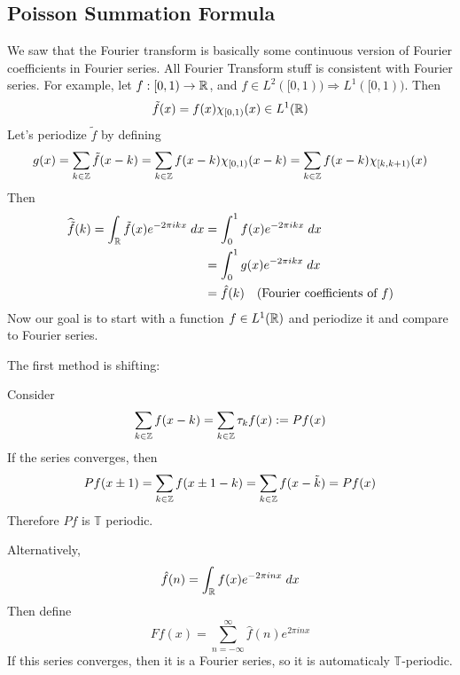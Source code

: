 \subsection{Poisson Summation Formula}
We saw that the Fourier transform is basically some continuous version of Fourier coefficients in
Fourier series. 
All Fourier Transform stuff is consistent with Fourier series. For example, let $f : [0, 1) \to \mathbb{R}$,
and $f \in L^2([0, 1)) \Rightarrow L^1([0, 1))$. Then
\[
    \tilde{f}(x) = f(x) \chi_{[0, 1)}(x) \in L^1(\mathbb{R})
\] 
Let's periodize $\tilde{f}$ by defining 
\[
    g(x) = \sum_{k \in \mathbb{Z}} \tilde{f}(x - k) = \sum_{k \in \mathbb{Z}} f(x-k) \chi_{[0, 1)}(x-k) = \sum_{k \in \mathbb{Z}} f(x-k) \chi_{[k, k+1)}(x)
\]  
Then
\begin{align*}
    \widehat{\tilde{f}}(k) = \int_{\mathbb{R}} \tilde{f}(x) e^{-2 \pi i k x} \; dx &= \int_0^1 f(x) e^{-2 \pi i k x} \; dx \\
    &= \int_0^1 g(x) e^{-2 \pi i k x} \; dx \\
    &= \hat{f}(k) \quad \text{(Fourier coefficients of $f$)}
\end{align*}
Now our goal is to start with a function $f \in L^1(\mathbb{R})$ and periodize it and compare to Fourier series.

The first method is shifting:

Consider
\[
    \sum_{k \in \mathbb{Z}} f(x-k) = \sum_{k \in \mathbb{Z}} \tau_k f(x) := Pf(x)
\]  
If the series converges, then
\[
    Pf(x \pm 1) = \sum_{k \in \mathbb{Z}} f( x \pm 1 - k) = \sum_{k \in \mathbb{Z}} f(x - \tilde{k}) = Pf(x)
\] 
Therefore $Pf$ is $\mathbb{T}$ periodic.   

Alternatively, 
\[
    \hat{f}(n) = \int_{\mathbb{R}} f(x) e^{-2 \pi i n x} \; dx
\] 
Then define
\[
    F f(x) = \sum_{n = -\infty}^\infty \hat{f}(n) e^{2 \pi i n x}
\] 
If this series converges, then it is a Fourier series, so it is automaticaly $\mathbb{T}$-periodic.

